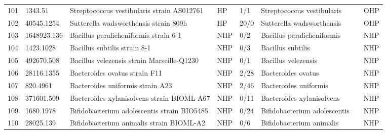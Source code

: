 \begin{longtable}{llllllll}
101 &       1343.51 &                               Streptococcus vestibularis strain AS012761 &    HP &       1/1 &                     Streptococcus vestibularis &                      \cite{tufan2010spondylodiscitis,1343.51} &   OHP \\
102 &    40545.1254 &                                    Sutterella wadsworthensis strain 809h &    HP &      20/0 &                      Sutterella wadsworthensis &                           \cite{wang2013increased,40545.1254} &   OHP \\
103 &   1648923.136 &                                    Bacillus paralicheniformis strain 6-1 &   NHP &       0/2 &                     Bacillus paralicheniformis &                           \cite{zhao2020adhesion,1648923.136} &   NHP \\
104 &     1423.1028 &                                             Bacillus subtilis strain 8-1 &   NHP &       0/3 &                              Bacillus subtilis &                      \cite{elshaghabee2017bacillus,1423.1028} &   NHP \\
105 &    492670.508 &                               Bacillus velezensis strain Marseille-Q1230 &   NHP &       0/1 &                            Bacillus velezensis &                             \cite{492670.508,reva2019genetic} &   NHP \\
106 &    28116.1355 &                                            Bacteroides ovatus strain F11 &   NHP &      2/28 &                             Bacteroides ovatus &                                \cite{28116.1355,tan2018pilot} &   NHP \\
107 &      820.4961 &                                         Bacteroides uniformis strain A23 &   NHP &      2/46 &                          Bacteroides uniformis &                         \cite{820.4961,benitez2017glycolytic} &   NHP \\
108 &    371601.509 &                               Bacteroides xylanisolvens strain BIOML-A67 &   NHP &      0/11 &                      Bacteroides xylanisolvens &                \cite{poyet2019library,ulsemer2012preliminary} &   NHP \\
109 &     1680.1978 &                              Bifidobacterium adolescentis strain BIO5485 &   NHP &      0/24 &                   Bifidobacterium adolescentis &                                       \cite{pompei2007folate} &   NHP \\
110 &     28025.139 &                                 Bifidobacterium animalis strain BIOML-A2 &   NHP &       0/6 &                       Bifidobacterium animalis &                   \cite{poyet2019library,lugli2019dissecting} &   NHP \\

\end{longtable}
